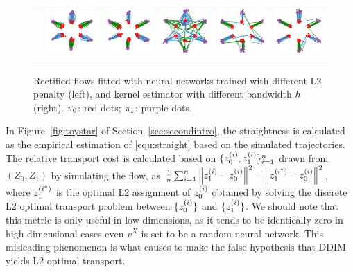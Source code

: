 \begin{figure}[tbh]
{\begin{tabular}{cccccc}
& \includegraphics[width=.14\textwidth]{arxiv_figures/reflow_wd0.01.pdf} & \includegraphics[width=.14\textwidth]{arxiv_figures/reflow1_wd0.01.pdf} &
\raisebox{1.2em}{\rotatebox{90}{\tmpfsize{$h=1$}}}
\includegraphics[width=.14\textwidth]{arxiv_figures/reflow_kernel_h1.pdf}
& \includegraphics[width=.14\textwidth]{arxiv_figures/reflow_kernel1_h1.pdf} & \includegraphics[width=.14\textwidth]{arxiv_figures/reflow_kernel2_h1.pdf} \\

\vspace{-15pt}
\end{tabular}}
\caption{
Rectified flows 
fitted with 
neural networks trained with different L2 penalty (left), and kernel estimator with different bandwidth $h$ (right).  
${\pi}_0$: red dots; ${\pi}_1$: purple dots. 
}
\label{fig:smoothness}
\vspace{-5pt}
\end{figure}

In Figure~\ref{fig:toystar} of Section~\ref{sec:secondintro},  
the straightness is calculated as the empirical estimation of \eqref{equ:straight} based on the simulated trajectories.
The relative transport cost is calculated based on  $\{z_0^{(i)},z_1^{(i)}\}_{i=1}^n$ drawn from $(Z_0,Z_1)$ by simulating the flow, as $\frac{1}{n}\sum_{i=1}^n \left\lVert z_1^{(i)}-z_0^{(i)}\right\rVert^2 - \left\lVert z_1^{(i^*)}-z_0^{(i)}\right\rVert^2$, where $z_1^{(i^*)}$ is the optimal L2 assignment of $z_0^{(i)}$ obtained by solving the discrete L2 optimal transport problem between $\{z_0^{(i)}\}$ and $\{z_1^{(i)}\}$. 
We should 
note that this metric is only useful in low dimensions, as it tends to be identically zero in high dimensional cases 
even $v^X$ is set to be a random neural network.
This misleading phenomenon is what causes  \cite{khrulkov2022understanding} to make the false hypothesis that DDIM yields L2 optimal transport. 


